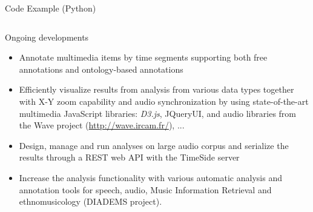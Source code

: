 \documentclass[final, hyperref, table]{beamer}
\begin{document}
\begin{frame}[containsverbatim]{}
\begin{columns}[T]
\begin{column}[T]{.49\linewidth}
\begin{block}{Code Example (Python)}
\begin{columns}[T]
  \begin{column}[T]{0.35\linewidth}
  \end{column}
\end{columns}
  \end{block}

  \begin{block}{Ongoing developments}
\vspace{-1cm}
    \begin{multicols}{2}[]
        \begin{itemize}
        \item \alert{Annotate} multimedia items by time segments supporting both free annotations and ontology-based annotations
        \item Efficiently \alert{visualize} results from analysis from various data types together with X-Y zoom capability and audio synchronization by using state-of-the-art multimedia JavaScript libraries: \emph{D3.js}, JQueryUI, and audio libraries from the Wave project (\url{http://wave.ircam.fr/}), ...
        \item Design, manage and run analyses on large audio corpus and serialize the results through a REST web API with the TimeSide server
        \item Increase the analysis functionality with various automatic analysis and annotation tools for speech, audio, Music Information Retrieval and ethnomusicology (DIADEMS project).


\end{itemize}
\end{multicols}
\end{block}
\end{column}
\end{columns}
\end{frame}
\end{document}
